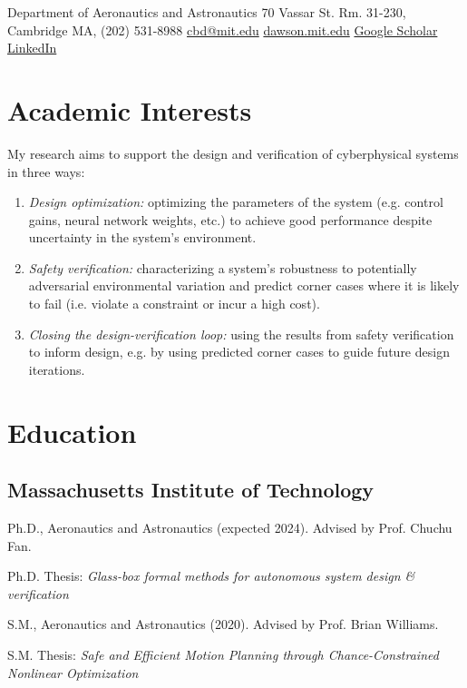 \documentclass{cv_style}
\begin{document}

\begin{center} 

    {Department of Aeronautics and Astronautics}
    {70 Vassar St. Rm. 31-230, Cambridge MA, (202) 531-8988}
    {\href{mailto:cbd@mit.edu}{cbd@mit.edu}}
    {\href{http://www.dawson.mit.edu}{dawson.mit.edu}}
    {\href{https://scholar.google.com/citations?user=FkDdz9gAAAAJ&hl=en}{Google Scholar}}
    {\href{https://www.linkedin.com/in/c6d5/}{LinkedIn}}

\end{center}

\section{Academic Interests}
My research aims to support the design and verification of cyberphysical systems in three ways:
\begin{enumerate}
    \item \textit{Design optimization:} optimizing the parameters of the system (e.g. control gains, neural network weights, etc.) to achieve good performance despite uncertainty in the system's environment.
    \item \textit{Safety verification:} characterizing a system's robustness to potentially adversarial environmental variation and predict corner cases where it is likely to fail (i.e. violate a constraint or incur a high cost).
    \item \textit{Closing the design-verification loop:} using the results from safety verification to inform design, e.g. by using predicted corner cases to guide future design iterations.
\end{enumerate}

\section{Education}
    \subsection{Massachusetts Institute of Technology}
            \begin{description}[itemsep=-0.1em]
                \item Ph.D., Aeronautics and Astronautics (expected 2024). Advised by Prof. Chuchu Fan.
                \item Ph.D. Thesis: {\em Glass-box formal methods for autonomous system design \& verification}
                \item S.M., Aeronautics and Astronautics (2020). Advised by Prof. Brian Williams.
                \item S.M. Thesis: {\em Safe and Efficient Motion Planning through Chance-Constrained Nonlinear Optimization}
            \end{description}
\end{document}

